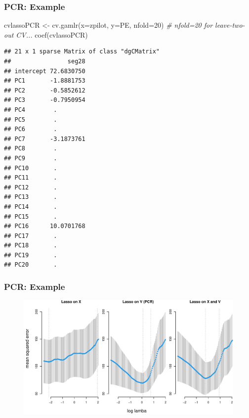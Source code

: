 \documentclass[
  shownotes,
  xcolor={svgnames},
  hyperref={colorlinks,citecolor=DarkBlue,linkcolor=DarkRed,urlcolor=DarkBlue}
  , aspectratio=169]{beamer}
\newenvironment{Shaded}{\begin{snugshade}}{\end{snugshade}}
\newcommand{\AttributeTok}[1]{\textcolor[rgb]{0.77,0.63,0.00}{#1}}
\newcommand{\CommentTok}[1]{\textcolor[rgb]{0.56,0.35,0.01}{\textit{#1}}}
\newcommand{\DecValTok}[1]{\textcolor[rgb]{0.00,0.00,0.81}{#1}}
\newcommand{\FunctionTok}[1]{\textcolor[rgb]{0.00,0.00,0.00}{#1}}
\newcommand{\NormalTok}[1]{#1}
\newcommand{\OtherTok}[1]{\textcolor[rgb]{0.56,0.35,0.01}{#1}}
\begin{document}
\begin{frame}[fragile]
\frametitle{PCR: Example }

\begin{scriptsize}
\begin{Shaded}
\begin{Highlighting}[]
\NormalTok{cvlassoPCR }\OtherTok{\textless{}{-}} \FunctionTok{cv.gamlr}\NormalTok{(}\AttributeTok{x=}\NormalTok{zpilot, }\AttributeTok{y=}\NormalTok{PE, }\AttributeTok{nfold=}\DecValTok{20}\NormalTok{) }\CommentTok{\# nfold=20 for leave{-}two{-}out CV... }
\FunctionTok{coef}\NormalTok{(cvlassoPCR) }
\end{Highlighting}
\end{Shaded}
\end{scriptsize}

\begin{tiny}
\begin{verbatim}
## 21 x 1 sparse Matrix of class "dgCMatrix"
##                seg28
## intercept 72.6830750
## PC1       -1.8881753
## PC2       -0.5852612
## PC3       -0.7950954
## PC4        .        
## PC5        .        
## PC6        .        
## PC7       -3.1873761
## PC8        .        
## PC9        .        
## PC10       .        
## PC11       .        
## PC12       .        
## PC13       .        
## PC14       .        
## PC15       .        
## PC16      10.0701768
## PC17       .        
## PC18       .        
## PC19       .        
## PC20       .
\end{verbatim}
\end{tiny}
\end{frame}

\begin{frame}[fragile]
\frametitle{PCR: Example }


 \begin{figure}[H] \centering
            \captionsetup{justification=centering}
              \includegraphics[scale=.6]{figures/unnamed-chunk-9-1.pdf}
 \end{figure}



\end{frame}
\end{document}
